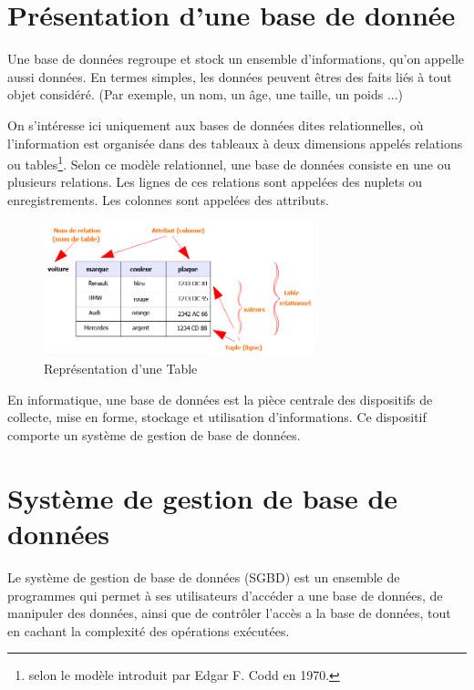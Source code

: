 \documentclass[oneside,13pt,a4paper]{report}
\begin{document}
\section{Présentation d’une base de donnée}

Une base de données regroupe et stock un ensemble d'informations, qu'on appelle aussi données. En termes simples, les données peuvent êtres des faits liés à tout objet considéré. (Par exemple, un nom, un âge, une taille, un poids ...)

On s'intéresse ici uniquement aux bases de données dites relationnelles, où l'information est organisée dans des tableaux à deux dimensions appelés relations ou tables\footnote{selon le modèle introduit par Edgar F. Codd en 1970.}.
Selon ce modèle relationnel, une base de données consiste en une ou plusieurs relations. Les lignes de ces relations sont appelées des nuplets ou enregistrements. Les colonnes sont appelées des attributs.

\begin{figure}[h]
	\centering
	\includegraphics[width=0.7\textwidth]{img/table_relationnel.png}
	\caption{Représentation d'une Table}
\end{figure}

En informatique, une base de données est la pièce centrale des dispositifs de collecte, mise en forme, stockage et utilisation d'informations. Ce dispositif comporte un système de gestion de base de données.

\section{Système de gestion de base de données}
\label{sgbd}

Le système de gestion de base de données (SGBD) est un ensemble de programmes qui permet à ses utilisateurs d'accéder a une base de données, de manipuler des données, ainsi que de contrôler l'accès a la base de données, tout en cachant la complexité des opérations exécutées.
\end{document}
